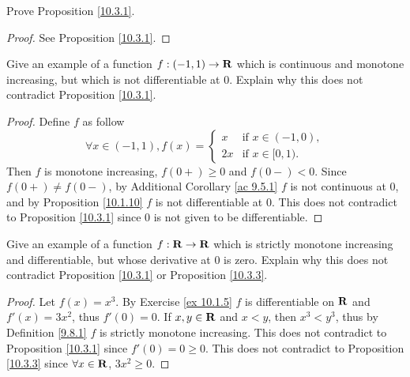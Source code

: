 \exercisesection

\begin{exercise}\label{ex 10.3.1}
    Prove Proposition \ref{10.3.1}.
\end{exercise}

\begin{proof}
    See Proposition \ref{10.3.1}.
\end{proof}

\begin{exercise}\label{ex 10.3.2}
    Give an example of a function \(f : (-1, 1) \to \mathbf{R}\) which is continuous and monotone increasing, but which is not differentiable at \(0\).
    Explain why this does not contradict Proposition \ref{10.3.1}.
\end{exercise}

\begin{proof}
    Define \(f\) as follow
    \[
        \forall x \in (-1, 1), f(x) = \begin{cases}
            x  & \text{if } x \in (-1, 0), \\
            2x & \text{if } x \in [0, 1).
        \end{cases}
    \]
    Then \(f\) is monotone increasing, \(f(0+) \geq 0\) and \(f(0-) < 0\).
    Since \(f(0+) \neq f(0-)\), by Additional Corollary \ref{ac 9.5.1} \(f\) is not continuous at \(0\), and by Proposition \ref{10.1.10} \(f\) is not differentiable at \(0\).
    This does not contradict to Proposition \ref{10.3.1} since \(0\) is not given to be differentiable.
\end{proof}

\begin{exercise}\label{ex 10.3.3}
    Give an example of a function \(f : \mathbf{R} \to \mathbf{R}\) which is strictly monotone increasing and differentiable, but whose derivative at \(0\) is zero.
    Explain why this does not contradict Proposition \ref{10.3.1} or Proposition \ref{10.3.3}.
\end{exercise}

\begin{proof}
    Let \(f(x) = x^3\).
    By Exercise \ref{ex 10.1.5} \(f\) is differentiable on \(\mathbf{R}\) and \(f'(x) = 3x^2\), thus \(f'(0) = 0\).
    If \(x, y \in \mathbf{R}\) and \(x < y\), then \(x^3 < y^3\), thus by Definition \ref{9.8.1} \(f\) is strictly monotone increasing.
    This does not contradict to Proposition \ref{10.3.1} since \(f'(0) = 0 \geq 0\).
    This does not contradict to Proposition \ref{10.3.3} since \(\forall x \in \mathbf{R}\), \(3x^2 \geq 0\).
\end{proof}


